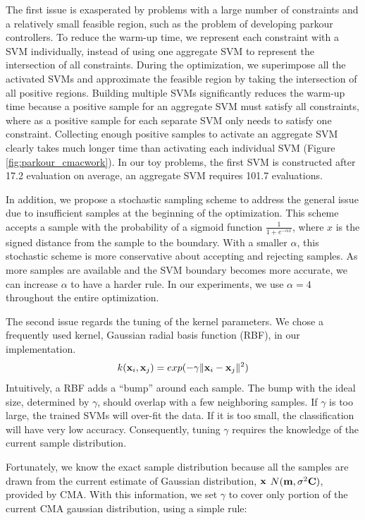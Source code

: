 The first issue is exasperated by problems with a large number
of constraints and a relatively small feasible region, such as the
problem of developing parkour controllers. To reduce the warm-up
time, we represent each constraint with a SVM individually, instead
of using one aggregate SVM to represent the intersection of all
constraints. During the optimization, we superimpose all the
activated SVMs and approximate the feasible region by taking the
intersection of all positive regions. Building multiple SVMs
significantly reduces the warm-up time because a positive
sample for an aggregate SVM must satisfy all constraints, where as a
positive sample for each separate SVM only needs to satisfy one
constraint. Collecting enough positive samples to activate an
aggregate SVM clearly takes much longer time than activating each
individual SVM (Figure \ref{fig:parkour_cmacwork}).  
In our toy problems, the first SVM is constructed after 17.2 evaluation
on average, an aggregate SVM requires 101.7 evaluations. 

In addition, we propose a stochastic sampling scheme to address
the general issue due to insufficient samples at the beginning of
the optimization. This scheme accepts a sample with the probability
of a sigmoid function $\frac{1}{1+e^{-\alpha x}}$, where $x$ is the
signed distance from the sample to the boundary. With a smaller
$\alpha$, this stochastic scheme is more conservative about
accepting and rejecting samples. As more samples are available and
the SVM boundary becomes more accurate, we can increase $\alpha$ to
have a harder rule. In our experiments, we use $\alpha = 4$
throughout the entire optimization.

The second issue regards the tuning of the kernel parameters. We chose
a frequently used kernel, Gaussian radial basis function (RBF), in our
implementation.
\begin{equation}
  k(\mathbf{x}_i, \mathbf{x}_j) = exp(-\gamma\|\mathbf{x}_i - \mathbf{x}_j\|^2)
\end{equation}
Intuitively, a RBF adds a ``bump'' around each sample. The bump with
the ideal size, determined by $\gamma$, should overlap with a few
neighboring samples.  If $\gamma$ is too large, the trained SVMs will
over-fit the data. If it is too small, the classification will have
very low accuracy. Consequently, tuning $\gamma$ requires the
knowledge of the current sample distribution.

Fortunately, we know the exact sample distribution because all the
samples are drawn from the current estimate of Gaussian distribution,
$\mathbf{x}$ \mytilde $N(\mathbf{m}, \sigma^2\mathbf{C})$, provided by CMA. With
this information, we set $\gamma$ to cover only portion of the current
CMA gaussian distribution, using a simple rule:

